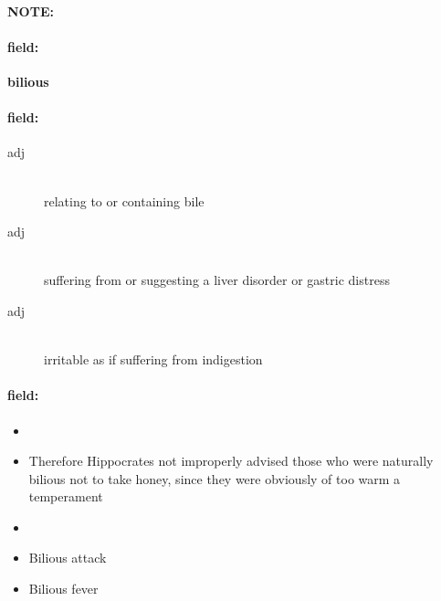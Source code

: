 \documentclass[12pt]{article}
\newenvironment{note}{\paragraph{NOTE:}}{}
\newenvironment{field}{\paragraph{field:}}{}
\begin{document}
\begin{note}
\begin{field}
\textbf{\large bilious}
\end{field}


\begin{field}
\begin{description}
\item[adj] \hfill \\ 
relating to or containing bile

\item[adj] \hfill \\ 
suffering from or suggesting a liver disorder or gastric distress

\item[adj] \hfill \\ 
irritable as if suffering from indigestion

\end{description}
\end{field}

\begin{field}
\begin{itemize}
\item 
\item Therefore Hippocrates not improperly advised those who were naturally bilious not to take honey, since they were obviously of too warm a temperament
\item  
\item Bilious attack
\item Bilious fever 
\end{itemize}
\end{field}
\end{note}
\end{document}

